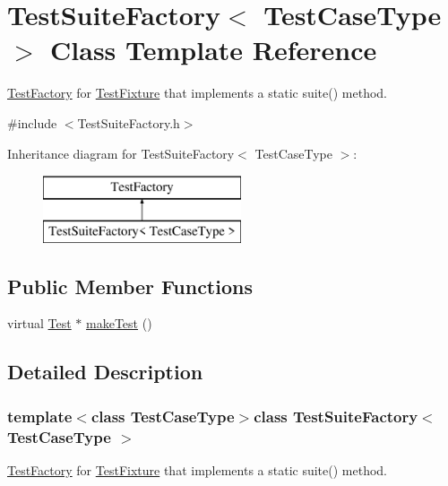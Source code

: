 \hypertarget{class_test_suite_factory}{\section{Test\-Suite\-Factory$<$ Test\-Case\-Type $>$ Class Template Reference}
\label{class_test_suite_factory}
}


\hyperlink{class_test_factory}{Test\-Factory} for \hyperlink{class_test_fixture}{Test\-Fixture} that implements a static suite() method.  




{\ttfamily \#include $<$Test\-Suite\-Factory.\-h$>$}

Inheritance diagram for Test\-Suite\-Factory$<$ Test\-Case\-Type $>$\-:\begin{figure}[H]
\begin{center}
\leavevmode
\includegraphics[height=2.000000cm]{class_test_suite_factory}
\end{center}
\end{figure}
\subsection*{Public Member Functions}
\begin{DoxyCompactItemize}
\item 
virtual \hyperlink{class_test}{Test} $\ast$ \hyperlink{class_test_suite_factory_a0790b11de1543fa894acd7069fd1f327}{make\-Test} ()
\end{DoxyCompactItemize}


\subsection{Detailed Description}
\subsubsection*{template$<$class Test\-Case\-Type$>$class Test\-Suite\-Factory$<$ Test\-Case\-Type $>$}

\hyperlink{class_test_factory}{Test\-Factory} for \hyperlink{class_test_fixture}{Test\-Fixture} that implements a static suite() method. 

